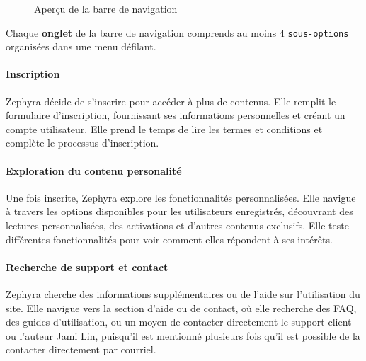 \documentclass[9pt]{report}
\begin{document}
\begin{multicols*}{2}
  \columnbreak


\begin{figure}[H]
\caption{Aperçu de la barre de navigation}
\end{figure}


\begin{note}{}{}
    Chaque \textbf{onglet} de la barre de navigation comprends 
    au moins 4 \texttt{sous-options} organisées dans une menu défilant.   
\end{note}

  \paragraph{Inscription}
  Zephyra décide de s'inscrire pour accéder à plus de contenus. Elle 
  remplit le formulaire d'inscription, fournissant ses informations
  personnelles et créant un compte utilisateur. Elle prend le temps de 
  lire les termes et conditions et complète le processus d'inscription.



  \paragraph{Exploration du contenu personalité}
  Une fois inscrite, Zephyra explore les fonctionnalités personnalisées. 
  Elle navigue à travers les options disponibles pour 
  les utilisateurs enregistrés, découvrant des lectures personnalisées, 
  des activations et d'autres contenus exclusifs. Elle teste différentes 
  fonctionnalités pour voir comment elles répondent à ses intérêts.


  \paragraph{Recherche de support et contact}
  Zephyra cherche des informations supplémentaires ou de l'aide sur 
  l'utilisation du site. Elle navigue vers la section d'aide ou de 
  contact, où elle recherche des FAQ, des guides d'utilisation, ou 
  un moyen de contacter directement le support client ou l'auteur Jami Lin, 
  puisqu'il est mentionné plusieurs fois qu'il est possible de la 
  contacter directement par courriel. 




\end{multicols*}
\end{document}
